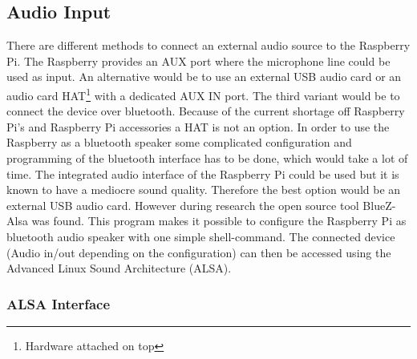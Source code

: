 \subsection{Audio Input}\label{sec:software:rec}
%
There are different methods to connect an external audio source to the Raspberry Pi. The Raspberry provides an AUX port where the microphone line could be used as input. An alternative would be to use an external USB audio card or an audio card HAT\footnote{Hardware attached on top} with a dedicated AUX IN port. The third variant would be to connect the device over bluetooth.\p
%
Because of the current shortage off Raspberry Pi's and Raspberry Pi accessories a HAT is not an option. In order to use the Raspberry as a bluetooth speaker some complicated configuration and programming of the bluetooth interface has to be done, which would take a lot of time. The integrated audio interface of the Raspberry Pi could be used but it is known to have a mediocre sound quality. Therefore the best option would be an external USB audio card. However during research the open source tool BlueZ-Alsa\cite{bokowy_bluez-alsa_2022} was found. This program makes it possible to configure the Raspberry Pi as bluetooth audio speaker with one simple shell-command. The connected device (Audio in/out depending on the configuration) can then be accessed using the Advanced Linux Sound Architecture (ALSA).
%
\subsubsection*{ALSA Interface}

